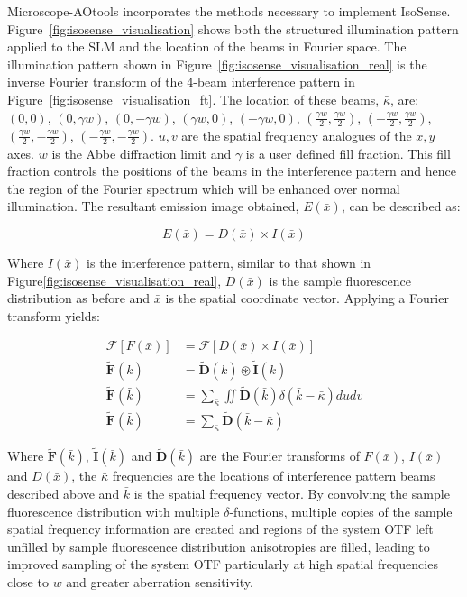 Microscope-AOtools incorporates the methods necessary to implement
IsoSense. Figure~\ref{fig:isosense_visualisation} shows both
the structured illumination pattern applied to the SLM 
and the location of the beams in Fourier space. The illumination
pattern shown in Figure~\ref{fig:isosense_visualisation_real} is
the inverse Fourier transform of the 4-beam interference pattern 
in Figure~\ref{fig:isosense_visualisation_ft}. The location 
of these beams, $\bar{\kappa}$, are: 
$(0,0)$, $(0,\gamma w)$, $(0,-\gamma w)$, $(\gamma w, 0)$, 
$(-\gamma w, 0)$, $(\frac{\gamma w}{2}, \frac{\gamma w}{2})$, 
$(-\frac{\gamma w}{2}, \frac{\gamma w}{2})$, $(\frac{\gamma w}{2},
-\frac{\gamma w}{2})$, $(-\frac{\gamma w}{2}, 
-\frac{\gamma w}{2})$. $u,v$ are the spatial frequency 
analogues of the $x,y$ axes. $w$ is the Abbe diffraction limit and 
$\gamma$ is a user defined fill fraction. This fill
fraction controls the positions of the beams in the interference
pattern and hence the region of the Fourier spectrum which will 
be enhanced over normal illumination. The resultant emission image 
obtained, $E(\bar{x})$, can be described as:

\begin{equation}\label{eq:isosense_real}
E(\bar{x}) = D(\bar{x}) \times I(\bar{x})
\end{equation}	

Where $I(\bar{x})$ is the interference pattern, similar to that shown in 
Figure\ref{fig:isosense_visualisation_real}, $D(\bar{x})$ is the sample 
fluorescence distribution as before and $\bar{x}$ is the spatial 
coordinate vector. Applying a Fourier transform yields:

\begin{equation}\label{eq:isosense_ft}
\begin{split}
\mathcal{F}[F(\bar{x})] &= \mathcal{F}[D(\bar{x})\times I(\bar{x})] \\
\tilde{\textbf{F}}(\bar{k}) &= \tilde{\textbf{D}}(\bar{k}) \circledast \tilde{\textbf{I}}(\bar{k}) \\
\tilde{\textbf{F}}(\bar{k}) &= \sum_{\bar{\kappa}}\iint\tilde{\textbf{D}}(\bar{k})\delta(\bar{k} - \bar{\kappa})dudv \\
\tilde{\textbf{F}}(\bar{k}) &= \sum_{\bar{\kappa}}\tilde{\textbf{D}}(\bar{k} - \bar{\kappa})
\end{split}
\end{equation}

Where $\tilde{\textbf{F}}(\bar{k})$, $\tilde{\textbf{I}}(\bar{k})$ and 
$\tilde{\textbf{D}}(\bar{k})$ are the Fourier transforms of $F(\bar{x})$, 
$I(\bar{x})$ and $D(\bar{x})$, the $\bar{\kappa}$ frequencies are the 
locations of interference pattern beams described above and $\bar{k}$ is 
the spatial frequency vector. By convolving the sample fluorescence 
distribution with  multiple $\delta$-functions, multiple copies of the 
sample spatial frequency information are created and regions of the 
system OTF left  unfilled by sample fluorescence distribution anisotropies 
are filled, leading to  improved sampling of the system OTF particularly 
at high spatial frequencies close to $w$ and greater aberration 
sensitivity.\cite{vzurauskas2019isosense}

